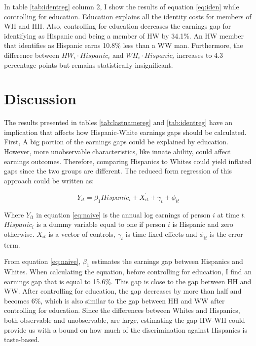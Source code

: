 \documentclass{wptemp}
\begin{document}
In table  \ref{tab:identreg} column 2, I show the results of equation \ref{eq:iden} while controlling for education. Education explains all the identity costs for members of WH and HH. Also, controlling for education decreases the earnings gap for identifying as Hispanic and being a member of HW by 34.1\%. An HW member that identifies as Hispanic earns 10.8\% less than a WW man. Furthermore, the difference between $HW_{i} \cdot Hispanic_{i}$  and $WH_{i} \cdot Hispanic_{i}$ increases to 4.3 percentage points but remains statistically insignificant.

\section{Discussion}
 
 The results presented in tables \ref{tab:lastnamereg} and \ref{tab:identreg} have an implication that affects how Hispanic-White earnings gaps should be calculated. First, A big portion of the earnings gaps could be explained by education. However, more unobservable characteristics, like innate ability, could affect earnings outcomes. Therefore, comparing Hispanics to Whites could yield inflated gaps since the two groups are different. The reduced form regression of this approach could be written as:
 
 \begin{equation} \label{eq:naive}
 Y_{it} = \beta_{1} Hispanic_{i} + X_{it}^{\prime} + \gamma_{t}+\phi_{it}
 \end{equation}
 
Where $Y_{it}$ in equation \ref{eq:naive} is the annual log earnings of person $i$ at time $t$. $Hispanic_{i}$ is a dummy variable equal to one if person $i$ is Hispanic and zero otherwise. $X_{it}$ is a vector of controls, $\gamma_{t}$ is time fixed effects and $\phi_{it}$ is the error term.
 
From equation \ref{eq:naive}, $\beta_{1}$ estimates the earnings gap between Hispanics and Whites. When calculating the equation, before controlling for education, I find an earnings gap that is equal to 15.6\%. This gap is close to the gap between HH and WW. After controlling for education, the gap decreases by more than half and becomes 6\%, which is also similar to the gap between HH and WW after controlling for education. Since the differences between Whites and Hispanics, both observable and unobservable, are large, estimating the gap HW-WH could provide us with a bound on how much of the discrimination against Hispanics is taste-based. 
 
\end{document}
